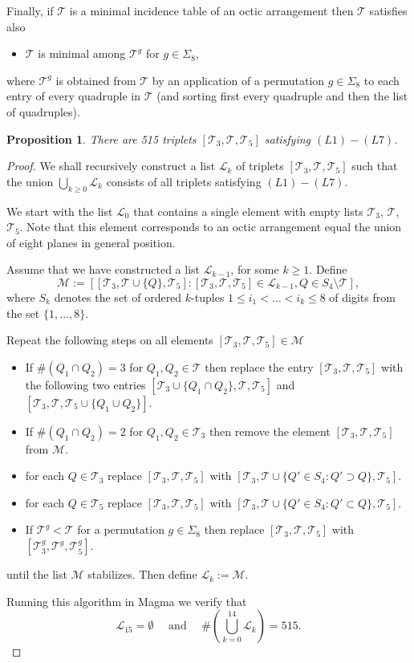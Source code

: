 \documentclass[12pt]{amsart}
\theoremstyle{plain}
\newtheorem{prop}[theorem]{Proposition}
\theoremstyle{remark}
\theoremstyle{definition}
\newcommand\mt{{\mathcal T}}
\numberwithin{table}{section}
\begin{document}
Finally, if $\mathcal T$ is a minimal incidence table of an octic arrangement then $\mathcal T$ satisfies also
\begin{itemize}
\item [(L7)] $\mathcal T$ is minimal among $\mathcal T^{g}$ for $g\in\Sigma_{8}$,
\end{itemize}
where $\mathcal T^{g}$ is obtained from $\mathcal T$ by an application of a permutation $g\in\Sigma_{8}$ to each entry of every quadruple in $\mathcal T$ (and sorting first every quadruple and then the list of quadruples).
\begin{prop}
	There are 515 triplets $[\mathcal T_{3}, \mathcal T, \mathcal
	T_{5}]$ satisfying $(L1)-(L7)$.
\end{prop}
\begin{proof}
We shall recursively construct a list $\mathcal L_{k}$ of triplets $[\mathcal T_{3}, \mathcal
T, \mathcal T_{5}]$ such that the union $\bigcup_{k\ge0}\mathcal L_{k}$ consists of all triplets satisfying $(L1)-(L7)$.

We start with the list
$\mathcal L_{0}$ that contains a single element with empty lists
$\mt_{3}$, $\mt$, $\mt_{5}$. Note that this element corresponds to an octic arrangement equal the union of eight planes in general position.

Assume that we have constructed a list $\mathcal L_{k-1}$, for some $k\ge1$.
Define
\[\mathcal M:=[[\mt_{3},\mt\cup \{Q\},\mt_{5}]:
[\mt_{3},\mt,\mt_{5}]\in\mathcal L_{k-1}, Q\in S_{4}\setminus
\mt],\]
where $S_{k}$ denotes the set of ordered $k$-tuples $1\le
i_{1}<\dots<i_{k}\le 8$ of digits from the set $\{1,\dots,8\}$.

Repeat the following steps on all elements $[\mt_{3},\mt,\mt_{5}]\in
\mathcal M$
\begin{itemize}
	\itemsep=2mm
	\item [A1:] If $\#(Q_{1}\cap Q_{2})=3$ for $Q_{1},Q_{2}\in\mt$ then replace
	the entry $[\mt_{3},\mt,\mt_{5}]$ with the following two entries $[\mt_{3}\cup\{Q_{1}\cap
	Q_{2}\},\mt,\mt_{5}]$ and $[\mt_{3},\mt,\mt_{5}\cup\{Q_{1}\cup
	Q_{2}\}]$.
	\item [A2:] If $\#(Q_{1}\cap Q_{2})=2$ for $Q_{1},Q_{2}\in\mathcal T_{3}$
	then remove the element $[\mt_{3},\mt,\mt_{5}]$ from  $\mathcal M$.
	\item [A2:] for each $Q\in\mt_{3}$ replace $[\mt_{3},\mt,\mt_{5}]$ with
	$[\mt_{3},\mt\cup\{Q'\in S_{4}:Q'\supset Q\},\mt_{5}]$.
	\item [A3:] for each $Q\in\mt_{5}$ replace $[\mt_{3},\mt,\mt_{5}]$ with
	$[\mt_{3},\mt\cup\{Q'\in S_{4}:Q'\subset Q\},\mt_{5}]$.
	\item [A4:] If $\mt^{g}<\mt$ for a permutation $g\in\Sigma_{8}$ then replace
	$[\mt_{3},\mt,\mt_{5}]$ with  $[\mt_{3}^{g},\mt^{g},\mt_{5}^{g}]$.
\end{itemize}
until the list $\mathcal M$ stabilizes. Then define $\mathcal
L_{k}:=\mathcal M$.

Running this algorithm in Magma we verify that
\[\mathcal L_{15}=\emptyset \quad\text{ and }\quad
\#\left( \bigcup_{k=0}^{14}\mathcal L_{k}\right)=515.\]
\end{proof}
\end{document}
